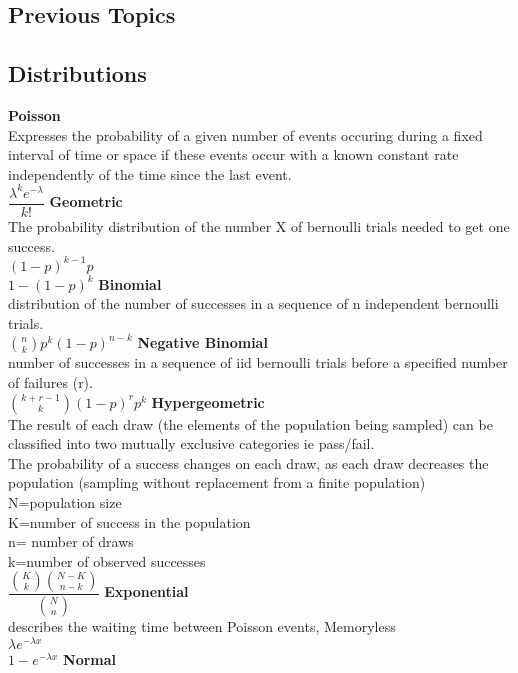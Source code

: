 \documentclass{article}
\begin{document}
\begin{flushleft}
\section*{Previous Topics}
\subsection*{Distributions}
\textbf{Poisson}\\
Expresses the probability of a given number of events occuring during a fixed interval of time or space if these events occur with a known constant rate independently of the time since the last event.\\
$\dfrac{\lambda^k e^{-\lambda}}{k!}$\medbreak
\textbf{Geometric}\\
The probability distribution of the number X of bernoulli trials needed to get one success.\\
$(1-p)^{k-1}p$\\
$1-(1-p)^k$\medbreak
\textbf{Binomial}\\
distribution of the number of successes in a sequence of n independent bernoulli trials.\\
$\binom{n}{k} p^k(1-p)^{n-k}$ \medbreak
\textbf{Negative Binomial}\\
number of successes in a sequence of iid bernoulli trials before a specified number of failures (r).\\
$\binom{k+r-1}{k}(1-p)^r p^k$\medbreak
\textbf{Hypergeometric}\\
The result of each draw (the elements of the population being sampled) can be classified into two mutually exclusive categories ie pass/fail.\\
The probability of a success changes on each draw, as each draw decreases the population (sampling without replacement from a finite population)\\
N=population size\\
K=number of success in the population\\
n= number of draws\\
k=number of observed successes\\
$\dfrac{\binom{K}{k}\binom{N-K}{n-k}}{\binom{N}{n}}$\medbreak
\textbf{Exponential}\\
describes the waiting time between Poisson events, Memoryless\\
$\lambda e^{-\lambda x}$\\
$1-e^{-\lambda x}$\medbreak
\textbf{Normal}\\

\end{flushleft}
\end{document}
